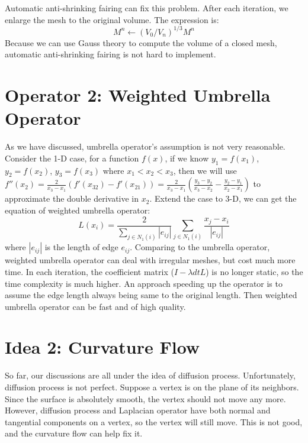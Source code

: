 \documentclass[tog]{acmsiggraph}
\begin{document}
Automatic anti-shrinking fairing can fix this problem. After each iteration, we enlarge the mesh to the original volume. The expression is:
\begin{equation}
	M^n \leftarrow (V_0 / V_n)^{1/3} M^n
\end{equation}
Because we can use Gauss theory to compute the volume of a closed mesh, automatic anti-shrinking fairing is not hard to implement.


\section{Operator 2: Weighted Umbrella Operator}

As we have discussed, umbrella operator's assumption is not very reasonable. Consider the 1-D case, for a function $f(x)$, if we know $y_1 = f(x_1)$, $y_2 = f(x_2)$, $y_3 = f(x_3)$ where $x_1 < x_2 < x_3$, then we will use $f''(x_2) =  \frac{2}{x_3 - x_1}(f'(x_{32})-f'(x_{21})) = \frac{2}{x_3 - x_1}(\frac{y_3 - y_2}{x_3 - x_2} - \frac{y_2 - y_1}{x_2 - x_1})$ to approximate the double derivative in $x_2$. Extend the case to 3-D, we can get the equation of weighted umbrella operator:
\begin{equation}
	L(x_i) = \frac{2}{\sum_{j \in N_1(i)} |e_{ij}|} \sum_{j \in N_1(i)} \frac{x_j - x_i}{|e_{ij}|}
\end{equation}
where $|e_{ij}|$ is the length of edge $e_{ij}$. Comparing to the umbrella operator, weighted umbrella operator can deal with irregular meshes, but cost much more time. In each iteration, the coefficient matrix ($I - \lambda dt L$) is no longer static, so the time complexity is much higher. An approach speeding up the operator is to assume the edge length always being same to the original length. Then weighted umbrella operator can be fast and of high quality.


\section{Idea 2: Curvature Flow}

So far, our discussions are all under the idea of diffusion process. Unfortunately, diffusion process is not perfect. Suppose a vertex is on the plane of its neighbors. Since the surface is absolutely smooth, the vertex should not move any more. However, diffusion process and Laplacian operator have both normal and tangential components on a vertex, so the vertex will still move. This is not good, and the curvature flow can help fix it.
\end{document}
